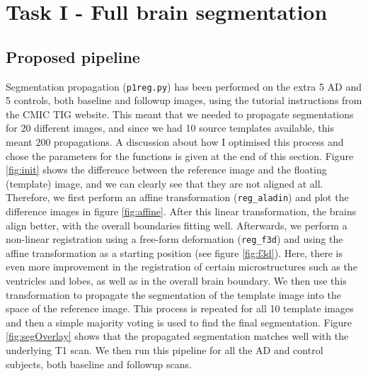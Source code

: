 \documentclass[11pt,a4paper,oneside]{report}
\begin{document}

\section*{Task I - Full brain segmentation}

\subsection*{Proposed pipeline}

Segmentation propagation (\texttt{p1reg.py}) has been performed on the extra 5 AD and 5 controls, both baseline and followup images, using the tutorial instructions from the CMIC TIG website. This meant that we needed to propagate segmentations for 20 different images, and since we had 10 source templates available, this meant 200 propagations. A discussion about how I optimised this process and chose the parameters for the functions is given at the end of this section. Figure \ref{fig:init} shows the difference between the reference image and the floating (template) image, and we can clearly see that they are not aligned at all. Therefore, we first perform an affine transformation (\texttt{reg\_aladin}) and plot the difference images in figure \ref{fig:affine}. After this linear transformation, the brains align better, with the overall boundaries fitting well. Afterwards, we perform a non-linear registration using a free-form deformation (\texttt{reg\_f3d}) and using the affine transformation as a starting position (see figure \ref{fig:f3d}). Here, there is even more improvement in the registration of certain microstructures such as the ventricles and lobes, as well as in the overall brain boundary. We then use this transformation to propagate the segmentation of the template image into the space of the reference image. This process is repeated for all 10 template images and then a simple majority voting is used to find the final segmentation. Figure \ref{fig:segOverlay} shows that the propagated segmentation matches well with the underlying T1 scan. We then run this pipeline for all the AD and control subjects, both baseline and followup scans.
\end{document}
